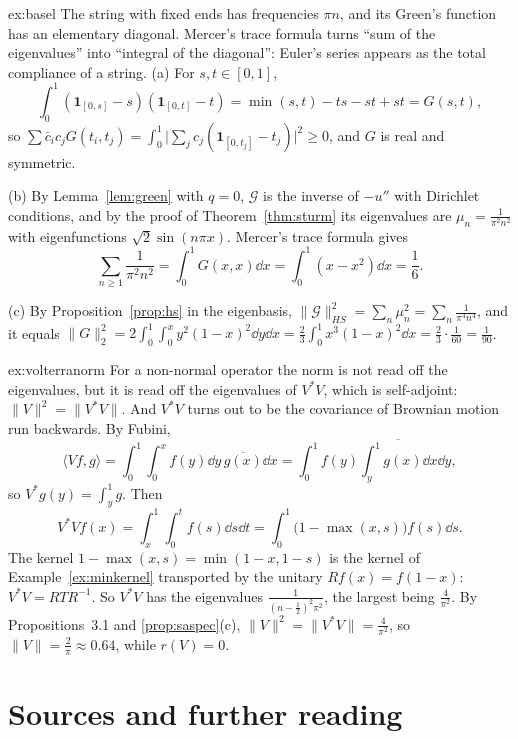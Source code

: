 \begin{solution}{ex:basel}
\idea The string with fixed ends has frequencies $\pi n$, and its Green's function has an elementary diagonal. Mercer's trace formula turns ``sum of the eigenvalues'' into ``integral of the diagonal'': Euler's
series appears as the total compliance of a string.
\writeup (a) For $s,t\in[0,1]$,
\[\int_0^1(\mathbf 1_{[0,s]}-s)(\mathbf 1_{[0,t]}-t)=\min(s,t)-ts-st+st=G(s,t),\]
so $\sum\bar c_ic_jG(t_i,t_j)=\int_0^1\bigl|\sum_jc_j(\mathbf 1_{[0,t_j]}-t_j)\bigr|^2\ge0$, and $G$ is real and symmetric.

(b) By Lemma~\ref{lem:green} with $q=0$, $\mathcal G$ is the inverse of $-u''$ with Dirichlet conditions, and by the proof of Theorem~\ref{thm:sturm} its eigenvalues are $\mu_n=\frac1{\pi^2n^2}$ with eigenfunctions $\sqrt2\sin(n\pi x)$.
Mercer's trace formula gives
\[\sum_{n\ge1}\frac1{\pi^2n^2}=\int_0^1G(x,x)\dd x=\int_0^1(x-x^2)\dd x=\frac16.\]

(c) By Proposition~\ref{prop:hs} in the eigenbasis, $\|\mathcal G\|_{HS}^2=\sum_n\mu_n^2=\sum_n\frac1{\pi^4n^4}$, and it equals $\|G\|_2^2=2\int_0^1\int_0^x y^2(1-x)^2\dd y\dd x=\frac23\int_0^1x^3(1-x)^2\dd x=\frac23\cdot\frac1{60}=\frac1{90}$.
\end{solution}

\begin{solution}{ex:volterranorm}
\idea For a non-normal operator the norm is not read off the eigenvalues, but it is read off the eigenvalues of $V^*V$, which is self-adjoint: $\|V\|^2=\|V^*V\|$. And $V^*V$ turns out to be the covariance of Brownian
motion run backwards.
\writeup By Fubini,
\[\langle Vf,g\rangle=\int_0^1\!\!\int_0^xf(y)\dd y\,\overline{g(x)}\dd x=\int_0^1f(y)\overline{\int_y^1g(x)\dd x}\dd y,\]
so $V^*g(y)=\int_y^1g$. Then
\[V^*Vf(x)=\int_x^1\int_0^tf(s)\dd s\dd t=\int_0^1\bigl(1-\max(x,s)\bigr)f(s)\dd s.\]
The kernel $1-\max(x,s)=\min(1-x,1-s)$ is the kernel of Example~\ref{ex:minkernel} transported by the unitary $Rf(x)=f(1-x)$: $V^*V=RTR^{-1}$. So $V^*V$ has the eigenvalues $\frac1{(n-\frac12)^2\pi^2}$, the largest being
$\frac4{\pi^2}$. By Propositions~3.1 and \ref{prop:saspec}(c), $\|V\|^2=\|V^*V\|=\frac4{\pi^2}$, so $\|V\|=\frac2\pi\approx0.64$, while $r(V)=0$.
\end{solution}

\section*{Sources and further reading}

